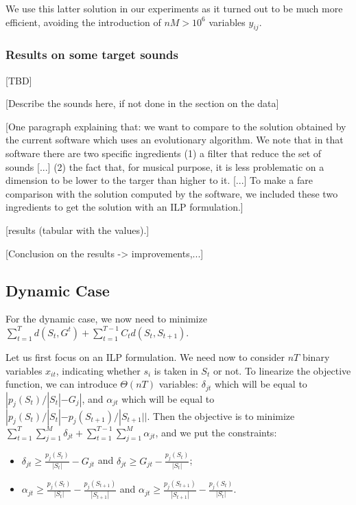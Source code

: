 \documentclass[a4paper]{book}
\begin{document}
We use this latter solution in our experiments as it turned out to be much more efficient, avoiding the introduction of $nM>10^6$ variables $y_{ij}$.


\subsubsection{Results on some target sounds}
[TBD]

[Describe the sounds here, if not done in the section on the data]

[One paragraph explaining that: we want to compare to the solution obtained by the current software which uses an evolutionary algorithm. We note that in that software there are two specific ingredients (1) a filter that reduce the set of sounds [...] (2) the fact that, for musical purpose, it is less problematic on a dimension to be lower to the targer than higher to it. 
[...]
To make a fare comparison with the solution computed by the software, we included these two ingredients to get the solution with an ILP formulation.]

[results (tabular with the values).]

[Conclusion on the results -> improvements,...]

\subsection{Dynamic Case}\label{sec:expdyn}

For the dynamic case, we now need to minimize $\sum_{t=1}^T d(S_t,G^t)+\sum_{t=1}^{T-1} C_t d(S_t,S_{t+1})$. 

Let us first focus on an ILP formulation. We need now to consider $nT$ binary variables $x_{it}$, indicating whether $s_i$ is taken in $S_t$ or not. To linearize the objective function, we can introduce $\Theta(nT)$ variables: $\delta_{jt}$ which will be equal to $|p_j(S_t)/|S_t|-G_j|$, and $\alpha_{jt}$ which will be equal to $|p_j(S_t)/|S_t|-p_j(S_{t+1})/|S_{t+1}||$. Then the objective is to minimize $\sum_{t=1}^T\sum_{j=1}^M \delta_{jt}+ \sum_{t=1}^{T-1}\sum_{j=1}^M \alpha_{jt}$, and we put the constraints:
\begin{itemize}
    \item $\delta_{jt}\geq \frac{p_j(S_t)}{|S_t|}-G_{jt}$ and $\delta_{jt}\geq G_{jt}-\frac{p_j(S_t)}{|S_t|}$;
    \item $\alpha_{jt}\geq \frac{p_j(S_t)}{|S_t|}-\frac{p_j(S_{t+1})}{|S_{t+1}|}$ and $\alpha_{jt}\geq \frac{p_j(S_{t+1})}{|S_{t+1}|}-\frac{p_j(S_t)}{|S_t|}$.
\end{itemize}
\end{document}
